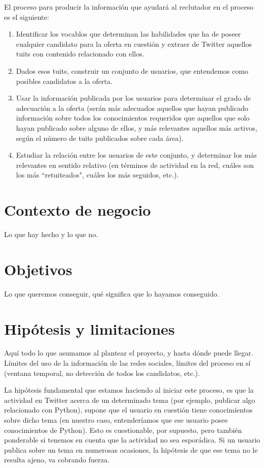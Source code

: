El proceso para producir la información que ayudará al reclutador en el proceso es el siguiente:
\begin{enumerate}
\item Identificar los vocablos que determinan las habilidades que ha de poseer cualquier candidato
para la oferta en cuestión y extraer de Twitter aquellos tuits con contenido relacionado con ellos.
\item Dados esos tuits, construir un conjunto de usuarios, que entendemos como posibles candidatos 
a la oferta.
\item Usar la información publicada por los usuarios para determinar el grado de adecuación a la oferta
(serán más adecuados aquellos que hayan publicado información sobre todos los conocimientos requeridos que 
aquellos que solo hayan publicado sobre alguno de ellos, y más relevantes aquellos más activos, según el
número de tuits publicados sobre cada área).
\item Estudiar la relación entre los usuarios de este conjunto, y determinar los más relevantes en sentido
relativo (en términos de actividad en la red, cuáles son los más ``retuiteados", cuáles los más seguidos, etc.).
\end{enumerate}



\section{Contexto de negocio}
Lo que hay hecho y lo que no.
\section{Objetivos}
Lo que queremos conseguir, qué significa que lo hayamos conseguido.
\section{Hip\'otesis y limitaciones}
Aquí todo lo que asumamos al plantear el proyecto, y hasta dónde puede llegar. Límites del uso de la información
de las redes sociales, límites del proceso en sí (ventana temporal, no detección de todos los candidatos, etc.).

La hipótesis fundamental que estamos haciendo al iniciar este proceso, es que la actividad en Twitter
acerca de un determinado tema (por ejemplo, publicar algo relacionado con Python), supone
que el usuario en cuestión tiene conocimientos sobre dicho tema (en nuestro caso, entenderíamos que ese
usuario posee conocimientos de Python). Esto es cuestionable, por supuesto, pero también ponderable
si tenemos en cuenta que la actividad no sea esporádica. Si un usuario publica sobre un tema
en numerosas ocasiones, la hipótesis de que ese tema no le resulta ajeno, va cobrando fuerza.

